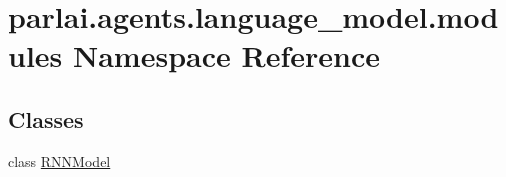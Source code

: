 \hypertarget{namespaceparlai_1_1agents_1_1language__model_1_1modules}{}\section{parlai.\+agents.\+language\+\_\+model.\+modules Namespace Reference}
\label{namespaceparlai_1_1agents_1_1language__model_1_1modules}
\subsection*{Classes}
\begin{DoxyCompactItemize}
\item 
class \hyperlink{classparlai_1_1agents_1_1language__model_1_1modules_1_1RNNModel}{R\+N\+N\+Model}
\end{DoxyCompactItemize}

